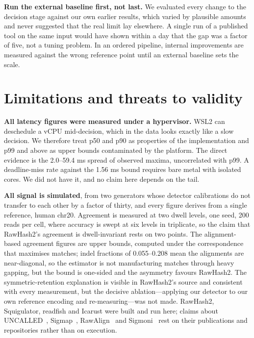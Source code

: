 \documentclass[runningheads]{llncs}
\begin{document}
\textbf{Run the external baseline first, not last.} We evaluated every change to the decision
stage against our own earlier results, which varied by plausible amounts and never suggested
that the real limit lay elsewhere. A single run of a published tool on the same input
would have shown within a day that the gap was a factor of five, not a tuning problem. In an
ordered pipeline, internal improvements are measured against the wrong reference point until an
external baseline sets the scale.

\section{Limitations and threats to validity}
\label{sec:limits}

\textbf{All latency figures were measured under a hypervisor.} WSL2 can deschedule a vCPU
mid-decision, which in the data looks exactly like a slow decision. We therefore treat p50 and
p90 as properties of the implementation and p99 and above as upper bounds contaminated by the
platform. The direct evidence is the 2.0--59.4 ms spread of observed maxima, uncorrelated with
p99. A deadline-miss rate against the 1.56 ms bound requires bare metal with isolated
cores. We did not have it, and no claim here depends on the tail.

\textbf{All signal is simulated}, from two generators whose detector calibrations do not
transfer to each other by a factor of thirty, and every figure derives from a single
reference, human chr20. Agreement is measured at two dwell levels, one seed, 200 reads per
cell, where accuracy is swept at six levels in triplicate, so the claim that RawHash2's
agreement is dwell-invariant rests on two points. The alignment-based agreement figures are
upper bounds, computed under the correspondence that maximises matches; indel fractions of
0.055--0.208 mean the alignments are near-diagonal, so the estimator is not manufacturing
matches through heavy gapping, but the bound is one-sided and the asymmetry favours RawHash2.
The symmetric-retention explanation is visible in RawHash2's source and consistent with every
measurement, but the decisive ablation---applying our detector to our own reference encoding
and re-measuring---was not made. RawHash2, Squigulator, readfish and Icarust were built and
run here; claims about UNCALLED~\cite{uncalled}, Sigmap~\cite{sigmap},
RawAlign~\cite{rawalign} and Sigmoni~\cite{sigmoni} rest on their publications and
repositories rather than on execution.
\end{document}
